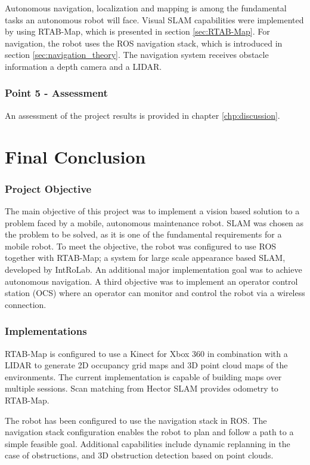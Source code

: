 Autonomous navigation, localization and mapping is among the fundamental tasks an autonomous robot will face. Visual \ac{SLAM} capabilities were implemented by using \ac{RTAB-Map}, which is presented in section \ref{sec:RTAB-Map}. For navigation, the robot uses the \ac{ROS} navigation stack, which is introduced in section \ref{sec:navigation_theory}. The navigation system receives obstacle information a depth camera and a \ac{LIDAR}. 

\subsubsection{Point 5 - Assessment}

An assessment of the project results is provided in chapter \ref{chp:discussion}.

\section{Final Conclusion}

\subsubsection{Project Objective}

The main objective of this project was to implement a vision based solution to a problem faced by a mobile, autonomous maintenance robot. \ac{SLAM} was chosen as the problem to be solved, as it is one of the fundamental requirements for a mobile robot.  To meet the objective, the robot was configured to use \ac{ROS} together with \ac{RTAB-Map}; a system for large scale appearance based \ac{SLAM}, developed by IntRoLab. An additional major implementation goal was to achieve autonomous navigation. A third objective was to implement an operator control station (\ac{OCS}) where an operator can monitor and control the robot via a wireless connection. 

\subsubsection{Implementations}

\ac{RTAB-Map} is configured to use a Kinect for Xbox 360 in combination with a \ac{LIDAR} to generate 2D occupancy grid maps and 3D point cloud maps of the environments. The current implementation is capable of building maps over multiple sessions. Scan matching from Hector SLAM provides odometry to \ac{RTAB-Map}. 

The robot has been configured to use the navigation stack in \ac{ROS}. The navigation stack configuration enables the robot to plan and follow a path to a simple feasible goal. Additional capabilities include dynamic replanning in the case of obstructions, and 3D obstruction detection based on point clouds.

